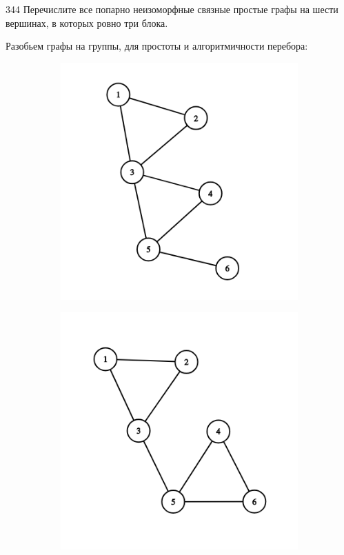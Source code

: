 \begin{task}{344}
Перечислите все попарно неизоморфные связные простые графы на шести вершинах, в которых ровно три блока.
\end{task}

\begin{solution}
Разобьем графы на группы, для простоты и алгоритмичности перебора:
\begin{figure}[H]
  \centering
  \begin{subfigure}[a]{0.24\linewidth}
    \includegraphics[width=\linewidth]{_img/344/01.png}
  \end{subfigure}
  \begin{subfigure}[a]{0.24\linewidth}
    \includegraphics[width=\linewidth]{_img/344/02.png}

\end{subfigure}
\end{figure}
\end{solution}
